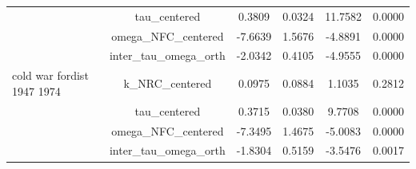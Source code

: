 \begin{table}[htbp]
\begin{tabular}{lccccc}
 & tau\_centered & 0.3809 & 0.0324 & 11.7582 & 0.0000 \\
 & omega\_NFC\_centered & -7.6639 & 1.5676 & -4.8891 & 0.0000 \\
 & inter\_tau\_omega\_orth & -2.0342 & 0.4105 & -4.9555 & 0.0000 \\
\hline
cold war fordist 1947 1974 & k\_NRC\_centered & 0.0975 & 0.0884 & 1.1035 & 0.2812 \\
 & tau\_centered & 0.3715 & 0.0380 & 9.7708 & 0.0000 \\
 & omega\_NFC\_centered & -7.3495 & 1.4675 & -5.0083 & 0.0000 \\
 & inter\_tau\_omega\_orth & -1.8304 & 0.5159 & -3.5476 & 0.0017 \\
\hline
\end{tabular}
\end{table}
